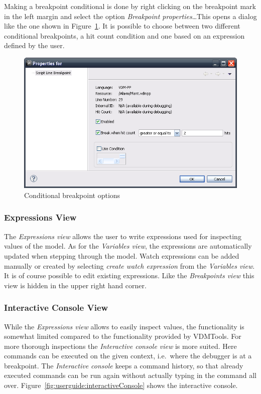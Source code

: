 \documentclass{overturerep}
\begin{document}
{Making a breakpoint conditional is done by right clicking on the breakpoint
mark in the left margin and select the option \emph{Breakpoint properties}\ldots This
opens a dialog like the one shown in
Figure~\ref{fig:userguide:BreakpointConditional}. It is possible to choose
between two different conditional breakpoints, a hit count condition and one
based on an expression defined by the user. 

\begin{figure}[htp]
\begin{center}
  \includegraphics[width=.6\textwidth]{figures/Breakpointconditional}
  \caption{Conditional breakpoint options}
  \label{fig:userguide:BreakpointConditional}
\end{center}
\end{figure}

\subsubsection{Expressions View}

The \emph{Expressions view} allows the user to write expressions used for inspecting
values of the model. As for the \emph{Variables view}, the expressions are 
automatically updated when stepping through the model.
Watch expressions can be added manually or created by selecting \emph{create watch
expression} from the \emph{Variables view}. It is of course possible to edit existing
expressions. Like the \emph{Breakpoints view} this view is hidden in the upper right
hand corner.

\subsubsection{Interactive Console View}

While the \emph{Expressions view} allows to easily inspect values, the functionality is
somewhat limited compared to the functionality provided by VDMTools. For more
thorough inspections the \emph{Interactive console view} is more suited. Here commands
can be executed on the given context, i.e.\ where the debugger is at a
breakpoint. The \emph{Interactive console} keeps a command history, so that already
executed commands can be run again without actually typing in the command all
over. Figure~\ref{fig:userguide:interactiveConsole} shows the interactive
console.

}
\end{document}
